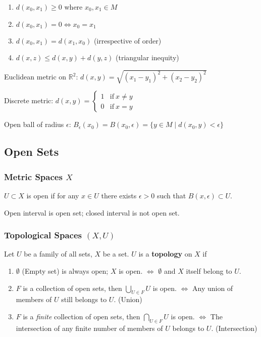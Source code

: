 \documentclass{article}
\begin{document}
        \begin{enumerate}
            \item $d(x_{0}, x_{1}) \geq 0$ where $x_{0}, x_{1} \in M$
            \item $d(x_{0}, x_{1}) = 0 \iff x_{0} = x_{1}$
            \item $d(x_{0}, x_{1}) = d(x_{1}, x_{0})$ (irrespective of order)
            \item $d(x, z) \leq d(x, y) + d(y, z)$ (triangular inequity)
        \end{enumerate}

        Euclidean metric on $\mathbb{R}^{2}$:
        $d(x, y) = \sqrt{(x_{1} - y_{1})^{2} + (x_{2} - y_{2})^{2}}$

        Discrete metric: $d(x, y) = \left\{\begin{matrix}
        1 &\mbox{if}\ x \neq y \\
        0 &\mbox{if}\ x = y 
        \end{matrix}\right.$

        Open ball of radius $\epsilon$:
        $B_{\epsilon}(x_{0}) = B(x_{0}, \epsilon) = \{ y \in M \mid d(x_{0}, y) < \epsilon \}$

    \subsection{Open Sets}

        \subsubsection{Metric Spaces $X$}

        $U \subset X$ is open if for any $x \in U$ there exists $\epsilon > 0$ such that $B(x, \epsilon) \subset U$.

        Open interval is open set; closed interval is not open set.

        \subsubsection{Topological Spaces $(X, U)$}

        Let $U$ be a family of all sets, $X$ be a set. $U$ is a \textbf{topology} on $X$ if

        \begin{enumerate}
            \item $\emptyset$ (Empty set) is always open; $X$ is open. $\Leftrightarrow$ $\emptyset$ and $X$ itself belong to $U$.
            \item $F$ is a collection of open sets, then $\bigcup_{U \in F} U$ is open. $\Leftrightarrow$ Any union of members of $U$ still belongs to $U$. (Union)
            \item $F$ is a \textit{finite} collection of open sets, then $\bigcap_{U \in F} U$ is open. $\Leftrightarrow$ The intersection of any finite number of members of $U$ belongs to $U$. (Intersection)
        \end{enumerate}
\end{document}
